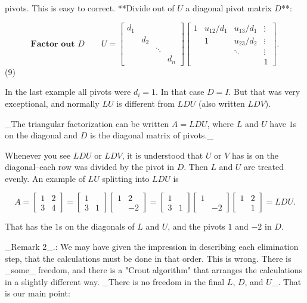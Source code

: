 pivots. This is easy to correct. **Divide out of \(U\) a diagonal pivot matrix \(D\)**:

\[\textbf{Factor out }D\qquad U=\begin{bmatrix}d_{1}&&&\\ &d_{2}&&\\ &&\ddots&\\ &&&d_{n}\end{bmatrix}\begin{bmatrix}1&u_{12}/d_{1}&u_{13}/d_{1}&\vdots\\ &1&u_{23}/d_{2}&\vdots\\ &&\ddots&\vdots\\ &&&1\end{bmatrix}.\] (9)

In the last example all pivots were \(d_{i}=1\). In that case \(D=I\). But that was very exceptional, and normally \(LU\) is different from \(LDU\) (also written \(LDV\)).

_The triangular factorization can be written \(A=LDU\), where \(L\) and \(U\) have \(1\)s on the diagonal and \(D\) is the diagonal matrix of pivots._

Whenever you see \(LDU\) or \(LDV\), it is understood that \(U\) or \(V\) has is on the diagonal--each row was divided by the pivot in \(D\). Then \(L\) and \(U\) are treated evenly. An example of \(LU\) splitting into \(LDU\) is

\[A=\begin{bmatrix}1&2\\ 3&4\end{bmatrix}=\begin{bmatrix}1\\ 3&1\end{bmatrix}\begin{bmatrix}1&2\\ &-2\end{bmatrix}=\begin{bmatrix}1\\ 3&1\end{bmatrix}\begin{bmatrix}1&\\ &-2\end{bmatrix}\begin{bmatrix}1&2\\ &1\end{bmatrix}=LDU.\]

That has the \(1\)s on the diagonals of \(L\) and \(U\), and the pivots \(1\) and \(-2\) in \(D\).

_Remark 2_.: We may have given the impression in describing each elimination step, that the calculations must be done in that order. This is wrong. There is _some_ freedom, and there is a "Crout algorithm" that arranges the calculations in a slightly different way. _There is no freedom in the final \(L\), \(D\), and \(U\)_. That is our main point:

